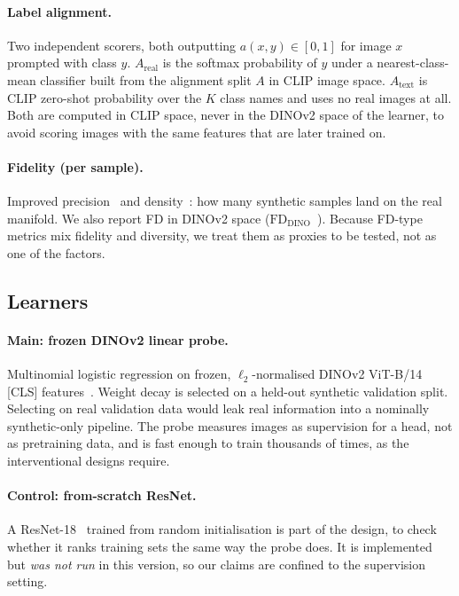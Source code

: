 \documentclass[10pt,twocolumn,letterpaper]{article}
\newcommand{\Areal}{A_{\text{real}}}
\newcommand{\Atext}{A_{\text{text}}}
\newcommand{\FDD}{\text{FD}_{\text{DINO}}}
\begin{document}
\paragraph{Label alignment.} Two independent scorers, both outputting $a(x,y)\in[0,1]$ for image $x$ prompted with class $y$. $\Areal$ is the softmax probability of $y$ under a nearest-class-mean classifier built from the alignment split $A$ in CLIP image space. $\Atext$ is CLIP zero-shot probability over the $K$ class names and uses no real images at all. Both are computed in CLIP space, never in the DINOv2 space of the learner, to avoid scoring images with the same features that are later trained on.

\paragraph{Fidelity (per sample).} Improved precision~\cite{kynkaanniemi2019improved} and density~\cite{naeem2020reliable}: how many synthetic samples land on the real manifold. We also report FD in DINOv2 space ($\FDD$~\cite{stein2023exposing}). Because FD-type metrics mix fidelity and diversity, we treat them as proxies to be tested, not as one of the factors.

\subsection{Learners}
\paragraph{Main: frozen DINOv2 linear probe.} Multinomial logistic regression on frozen, $\ell_2$-normalised DINOv2 ViT-B/14 [CLS] features~\cite{kornblith2019better}. Weight decay is selected on a held-out synthetic validation split. Selecting on real validation data would leak real information into a nominally synthetic-only pipeline. The probe measures images as supervision for a head, not as pretraining data, and is fast enough to train thousands of times, as the interventional designs require.

\paragraph{Control: from-scratch ResNet.} A ResNet-18~\cite{he2016deep} trained from random initialisation is part of the design, to check whether it ranks training sets the same way the probe does. It is implemented but \emph{was not run} in this version, so our claims are confined to the supervision setting.
\end{document}
